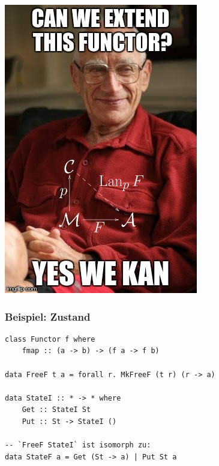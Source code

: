 \documentclass[12pt,compress,ngerman,utf8,t]{beamer}
\begin{document}
\begin{frame}[plain]
  \begin{center}
    \includegraphics[height=\textheight]{images/kan-extension}
  \end{center}
\end{frame}

\begin{frame}[fragile]\frametitle{Beispiel: Zustand}
  \begin{verbatim}
class Functor f where
    fmap :: (a -> b) -> (f a -> f b)

data FreeF t a = forall r. MkFreeF (t r) (r -> a)

data StateI :: * -> * where
    Get :: StateI St
    Put :: St -> StateI ()

-- `FreeF StateI` ist isomorph zu:
data StateF a = Get (St -> a) | Put St a
  \end{verbatim}
\end{frame}

\end{document}
